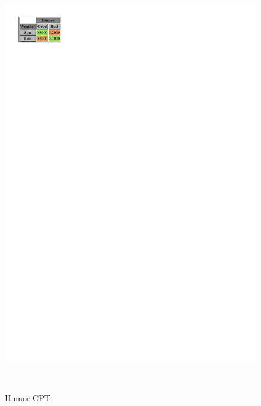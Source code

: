 \documentclass[a4paper,12pt]{article} %
\begin{document}
\begin{figure}[htb]
	\begin{minipage}[c]{.4\textwidth}
		\centering
		\includegraphics[width=\linewidth]{../code/humor.pdf}	
		\caption{Humor CPT}
		\label{fig:humor}
	\end{minipage}
	~
	\begin{minipage}[c]{.45\textwidth}
		\centering

\end{minipage}
\end{figure}
\end{document}

